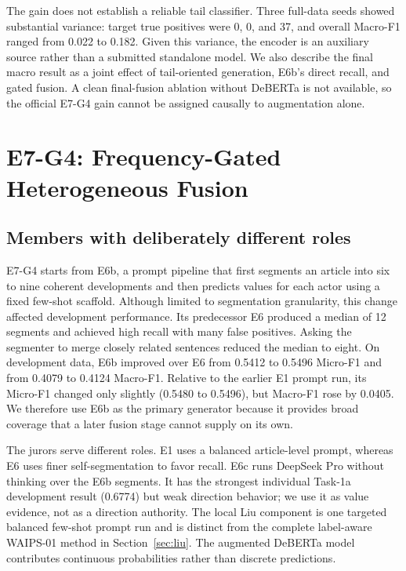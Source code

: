 \documentclass[sigconf,article,a4paper]{acmart}
\begin{document}
The gain does not establish a reliable tail classifier. Three
full-data seeds showed substantial variance: target true positives were 0, 0,
and 37, and overall Macro-F1 ranged from 0.022 to 0.182. Given this variance,
the encoder is an auxiliary source rather than a submitted standalone model.
We also describe the final macro result as a joint effect of tail-oriented
generation, E6b's direct recall, and gated fusion. A clean final-fusion
ablation without DeBERTa is not available, so the official E7-G4 gain cannot be
assigned causally to augmentation alone.

\section{E7-G4: Frequency-Gated Heterogeneous Fusion}
\label{sec:e7}

\subsection{Members with deliberately different roles}

E7-G4 starts from E6b, a prompt pipeline that first segments an article into
six to nine coherent developments and then predicts values for each actor using
a fixed few-shot scaffold. Although limited to segmentation granularity, this
change affected development performance. Its predecessor E6 produced a median
of 12 segments and achieved
high recall with many false positives. Asking the segmenter to merge closely
related sentences reduced the median to eight. On development data, E6b
improved over E6 from 0.5412 to 0.5496 Micro-F1 and from 0.4079 to 0.4124
Macro-F1. Relative to the earlier E1 prompt run, its Micro-F1 changed only
slightly (0.5480 to 0.5496), but Macro-F1 rose by 0.0405. We therefore use E6b
as the primary generator because it provides broad coverage that a later fusion
stage cannot supply on its own.

The jurors serve different roles. E1 uses a balanced article-level prompt,
whereas E6 uses finer self-segmentation to favor recall. E6c runs DeepSeek Pro
without thinking over the E6b segments. It has the strongest individual
Task-1a development result (0.6774) but weak direction behavior; we use it as
value evidence, not as a direction authority. The local Liu component is one
targeted balanced few-shot prompt run and is distinct from the
complete label-aware WAIPS-01 method in Section~\ref{sec:liu}. The
augmented DeBERTa model contributes continuous probabilities rather than
discrete predictions.
\end{document}
